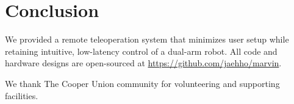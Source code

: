 \documentclass[acmsmall, screen]{acmart}
\begin{document}
\section{Conclusion}
We provided a remote teleoperation system that minimizes user setup while retaining intuitive, low-latency control of a dual-arm robot. All code and hardware designs are open-sourced at \url{https://github.com/jaehho/marvin}.

\begin{acks}
We thank The Cooper Union community for volunteering and supporting facilities.
\end{acks}



\end{document}
